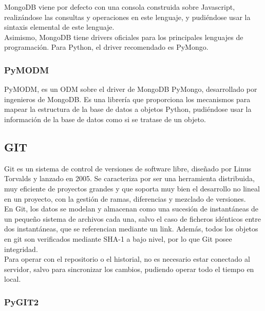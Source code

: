 MongoDB viene por defecto con una consola construida sobre Javascript, realizándose las consultas y operaciones en este lenguaje, y pudiéndose usar la sintaxis elemental de este lenguaje.\\


Asimismo, MongoDB tiene drivers oficiales para los principales lenguajes de programación. Para Python, el driver recomendado es PyMongo.\\


\subsubsection{PyMODM} 
\label{sec:pymod}

PyMODM, es un ODM sobre el driver de MongoDB PyMongo, desarrollado por ingenieros de MongoDB. Es una librería que proporciona los mecanismos para mapear la estructura de la base de datos a objetos Python, pudiéndose usar la información de la base de datos como si se tratase de un objeto.\\


\subsection{GIT} 
\label{sec:git}

Git es un sistema de control de versiones de software libre, diseñado por Linus Torvalds y lanzado en 2005. Se caracteriza por ser una herramienta distribuida, muy eficiente de proyectos grandes y que soporta muy bien el desarrollo no lineal en un proyecto, con la gestión de ramas, diferencias y mezclado de versiones.\\


En Git, los datos se modelan y almacenan como una sucesión de instantáneas de un pequeño sistema de archivos cada una, salvo el caso de ficheros idénticos entre dos instantáneas, que se referencian mediante un link. Además, todos los objetos en git son verificados mediante SHA-1 a bajo nivel, por lo que Git posee integridad.\\


Para operar con el repositorio o el historial, no es necesario  estar conectado al servidor, salvo para sincronizar los cambios, pudiendo operar todo el tiempo en local.\\


\subsubsection{PyGIT2} 
\label{sec:pygit2}

